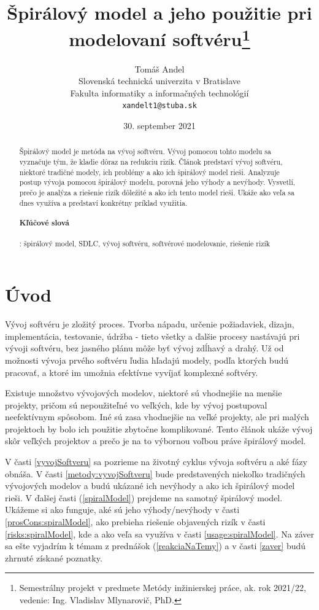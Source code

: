 \documentclass[10pt,twoside,slovak,a4paper]{article}
\title{Špirálový model a jeho použitie pri modelovaní softvéru\thanks{Semestrálny projekt v predmete Metódy inžinierskej práce, ak. rok 2021/22, vedenie: Ing. Vladislav Mlynarovič, PhD.}}
\author{Tomáš Andel\\[2pt]
	{\small Slovenská technická univerzita v Bratislave}\\
	{\small Fakulta informatiky a informačných technológií}\\
	{\small \texttt{xandelt1@stuba.sk}}
	}
\date{\small 30. september 2021}
\begin{document}
\maketitle

\begin{abstract}
Špirálový model je metóda na vývoj softvéru. Vývoj pomocou tohto modelu sa vyznačuje tým, že kladie dôraz na redukciu rizík. Článok predstaví vývoj softvéru, niektoré tradičné modely, ich problémy a ako ich špirálový model rieši. Analyzuje postup vývoja pomocou špirálový modelu, porovná jeho výhody a nevýhody. Vysvetlí, prečo je analýza a riešenie rizík dôležité a ako ich tento model rieši. Ukáže ako veľa sa dnes využíva a predstaví konkrétny príklad využitia.

\paragraph{Kľúčové slová}: špirálový model, SDLC, vývoj softvéru, softvérové modelovanie, riešenie rizík
\end{abstract}

\section{Úvod}

Vývoj softvéru je zložitý proces. Tvorba nápadu, určenie požiadaviek, dizajn, implementácia, testovanie, údržba - tieto všetky a ďalšie procesy nastávajú pri vývoji softvéru, bez jasného plánu môže byť vývoj zdĺhavý a drahý. Už od možnosti vývoja prvého softvéru ľudia hľadajú modely, podľa ktorých budú pracovať, a ktoré im umožnia efektívne vyvíjať komplexné softvéry.

Existuje množstvo vývojových modelov, niektoré sú vhodnejšie na menšie projekty, pričom sú nepoužiteľné vo veľkých, kde by vývoj postupoval neefektívnym spôsobom. Iné sú zasa vhodnejšie na veľké projekty, ale pri malých projektoch by bolo ich použitie zbytočne komplikované. Tento článok ukáže vývoj skôr veľkých projektov a prečo je na to výbornou voľbou práve špirálový model.

V časti \ref{vyvojSoftveru} sa pozrieme na životný cyklus vývoja softvéru a aké fázy obnáša. V časti \ref{metody:vyvojSoftveru} bude predstavených niekoľko tradičných vývojových modelov a budú ukázané ich nevýhody a ako ich špirálový model rieši. V ďalšej časti (\ref{spiralModel}) prejdeme na samotný špirálový model. Ukážeme si ako funguje, aké sú jeho výhody/nevýhody v časti \ref{prosCons:spiralModel}, ako prebieha riešenie objavených rizík v časti \ref{risks:spiralModel}, kde a ako veľa sa využíva v časti \ref{usage:spiralModel}. Na záver sa ešte vyjadrím k témam z prednášok (\ref{reakciaNaTemy}) a v časti \ref{zaver} budú zhrnuté získané poznatky.
\end{document}
